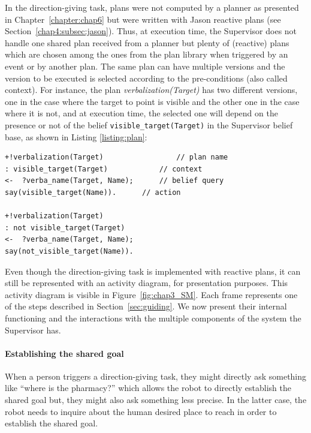 \documentclass[a4paper,11pt,twoside]{StyleThese}
\begin{document}
In the direction-giving task, plans were not computed by a planner as presented in Chapter~\ref{chapter:chap6} but were written with Jason reactive plans (see Section~\ref{chap4:subsec:jason}). Thus, at execution time, the Supervisor does not handle one shared plan received from a planner but plenty of (reactive) plans which are chosen among the ones from the plan library when triggered by an event or by another plan. The same plan can have multiple versions and the version to be executed is selected according to the pre-conditions (also called context). For instance, the plan \textit{verbalization(Target)} has two different versions, one in the case where the target to point is visible and the other one in the case where it is not, and at execution time, the selected one will depend on the presence or not of the belief \texttt{visible\_target(Target)} in the Supervisor belief base, as shown in Listing \ref{listing:plan}:

\begin{lstlisting}[caption = Two different plans for \texttt{verbalization(Target)}, label = {listing:plan}]
+!verbalization(Target)                 // plan name
: visible_target(Target)            // context
<-  ?verba_name(Target, Name);      // belief query
say(visible_target(Name)).      // action

+!verbalization(Target) 
: not visible_target(Target)
<-  ?verba_name(Target, Name);
say(not_visible_target(Name)).
\end{lstlisting}

Even though the direction-giving task is implemented with reactive plans, it can still be represented with an activity diagram, for presentation purposes. This activity diagram is visible in Figure~\ref{fig:chap3_SM}. Each frame represents one of the steps described in Section~\ref{sec:guiding}. We now present their internal functioning and the interactions with the multiple components of the system the Supervisor has.

\paragraph{Establishing the shared goal}
When a person triggers a direction-giving task, they might directly ask something like ``where is the pharmacy?'' which allows the robot to directly establish the shared goal but, they might also ask something less precise. In the latter case, the robot needs to inquire about the human desired place to reach in order to establish the shared goal.
\end{document}
